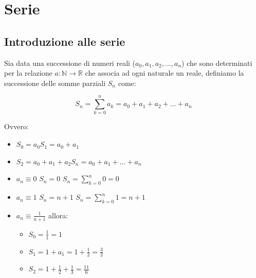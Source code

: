 \part{Serie}

\chapter{Introduzione alle serie}

\begin{dimostration*}
    Sia data una successione di numeri reali ($a_0, a_1, a_2, ..., a_n$) che sono determinati per la relazione $a:\mathbb{N}\rightarrow\mathbb{R}$ che associa ad ogni naturale un reale, definiamo la successione delle somme parziali $S_n$ come:
    
    \begin{equation*}
        S_n=\sum^n_{k=0}a_k=a_0+a_1+a_2+...+a_n
    \end{equation*}
    
    Ovvero: 
    \begin{itemize}
        \item[] $S_0=a_0$\hspace{2.5cm}$S_1=a_0+a_1$
        \item[] $S_2=a_0+a_1+a_2$\hspace{1cm}$S_n=a_0+a_1+...+a_n$
    \end{itemize}
    
\end{dimostration*}

\begin{example}
    \begin{itemize}
        \item $a_n\equiv0$\hspace{1cm} $S_n=0$\hspace{1cm} $S_n=\sum^n_{k=0}0=0$
        \item $a_n\equiv1$\hspace{1cm} $S_n=n+1$\hspace{1cm} $S_n=\sum^n_{k=0}1=n+1$
        \item $a_n\equiv\frac{1}{n+1}$ allora:\begin{itemize}
            \item $S_0=\frac{1}{1}=1$
            \item $S_1=1+a_1=1+\frac{1}{2}=\frac{3}{2}$
            \item $S_2=1+\frac{1}{2}+\frac{1}{3}=\frac{11}{6}$
        \end{itemize}
    \end{itemize}
\end{example}

